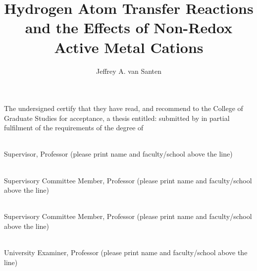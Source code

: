 \documentclass[msc,oneside]{ubcthesis}%
\title{Hydrogen Atom Transfer Reactions and the Effects of Non-Redox Active Metal Cations}
\author{Jeffrey A. van Santen} %
\begin{document}
\frontmatter                    %

\maketitle                      %

\makeatletter

The undersigned certify that they have read, and recommend to the College of
Graduate Studies for acceptance, a thesis entitled: {\sc \@title } submitted by
{\sc \@author} in partial fulfilment of the requirements of the degree of
\@degreetitle \makeatother

\newlength{\linespace}
\setlength{\linespace}{.75cm} %
\vspace{\linespace}\smaller

\noindent\underline{\hspace{30em}} \\
Supervisor, Professor (please print name and faculty/school above the line)

\vspace{\linespace}

\noindent\underline{\hspace{30em}} \\
Supervisory Committee Member, Professor (please print name and faculty/school above the line)

\vspace{\linespace}

\noindent\underline{\hspace{30em}} \\
Supervisory Committee Member, Professor (please print name and faculty/school above the line)

\vspace{\linespace}

\noindent\underline{\hspace{30em}} \\
University Examiner, Professor (please print name and faculty/school above the line)
\end{document}
